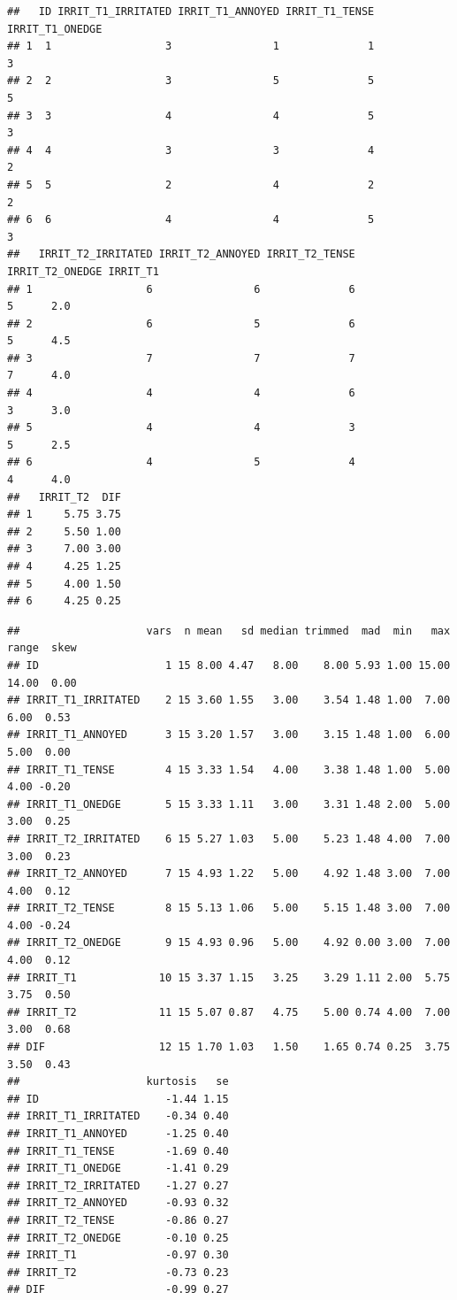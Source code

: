 \documentclass[
]{book}
\begin{document}
\begin{verbatim}
##   ID IRRIT_T1_IRRITATED IRRIT_T1_ANNOYED IRRIT_T1_TENSE IRRIT_T1_ONEDGE
## 1  1                  3                1              1               3
## 2  2                  3                5              5               5
## 3  3                  4                4              5               3
## 4  4                  3                3              4               2
## 5  5                  2                4              2               2
## 6  6                  4                4              5               3
##   IRRIT_T2_IRRITATED IRRIT_T2_ANNOYED IRRIT_T2_TENSE IRRIT_T2_ONEDGE IRRIT_T1
## 1                  6                6              6               5      2.0
## 2                  6                5              6               5      4.5
## 3                  7                7              7               7      4.0
## 4                  4                4              6               3      3.0
## 5                  4                4              3               5      2.5
## 6                  4                5              4               4      4.0
##   IRRIT_T2  DIF
## 1     5.75 3.75
## 2     5.50 1.00
## 3     7.00 3.00
## 4     4.25 1.25
## 5     4.00 1.50
## 6     4.25 0.25
\end{verbatim}

\begin{verbatim}
##                    vars  n mean   sd median trimmed  mad  min   max range  skew
## ID                    1 15 8.00 4.47   8.00    8.00 5.93 1.00 15.00 14.00  0.00
## IRRIT_T1_IRRITATED    2 15 3.60 1.55   3.00    3.54 1.48 1.00  7.00  6.00  0.53
## IRRIT_T1_ANNOYED      3 15 3.20 1.57   3.00    3.15 1.48 1.00  6.00  5.00  0.00
## IRRIT_T1_TENSE        4 15 3.33 1.54   4.00    3.38 1.48 1.00  5.00  4.00 -0.20
## IRRIT_T1_ONEDGE       5 15 3.33 1.11   3.00    3.31 1.48 2.00  5.00  3.00  0.25
## IRRIT_T2_IRRITATED    6 15 5.27 1.03   5.00    5.23 1.48 4.00  7.00  3.00  0.23
## IRRIT_T2_ANNOYED      7 15 4.93 1.22   5.00    4.92 1.48 3.00  7.00  4.00  0.12
## IRRIT_T2_TENSE        8 15 5.13 1.06   5.00    5.15 1.48 3.00  7.00  4.00 -0.24
## IRRIT_T2_ONEDGE       9 15 4.93 0.96   5.00    4.92 0.00 3.00  7.00  4.00  0.12
## IRRIT_T1             10 15 3.37 1.15   3.25    3.29 1.11 2.00  5.75  3.75  0.50
## IRRIT_T2             11 15 5.07 0.87   4.75    5.00 0.74 4.00  7.00  3.00  0.68
## DIF                  12 15 1.70 1.03   1.50    1.65 0.74 0.25  3.75  3.50  0.43
##                    kurtosis   se
## ID                    -1.44 1.15
## IRRIT_T1_IRRITATED    -0.34 0.40
## IRRIT_T1_ANNOYED      -1.25 0.40
## IRRIT_T1_TENSE        -1.69 0.40
## IRRIT_T1_ONEDGE       -1.41 0.29
## IRRIT_T2_IRRITATED    -1.27 0.27
## IRRIT_T2_ANNOYED      -0.93 0.32
## IRRIT_T2_TENSE        -0.86 0.27
## IRRIT_T2_ONEDGE       -0.10 0.25
## IRRIT_T1              -0.97 0.30
## IRRIT_T2              -0.73 0.23
## DIF                   -0.99 0.27
\end{verbatim}
\end{document}
